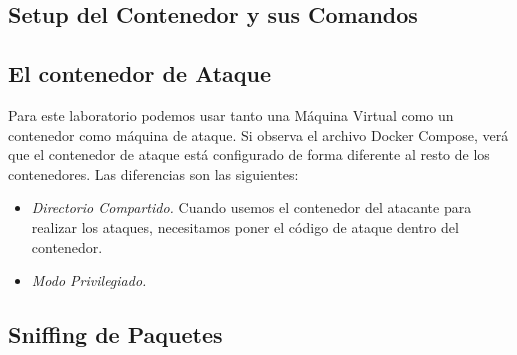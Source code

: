 \subsection{Setup del Contenedor y sus Comandos}




\subsection{El contenedor de Ataque}

Para este laboratorio podemos usar tanto una Máquina Virtual como un contenedor como máquina de ataque. Si observa el archivo Docker Compose, verá que el contenedor de ataque está configurado de forma diferente al resto de los contenedores. Las diferencias son las siguientes:

\begin{itemize}
\item \textit{Directorio Compartido.} Cuando usemos el contenedor del atacante para realizar los ataques, necesitamos poner el código de ataque dentro del contenedor.



\item \textit{Modo Privilegiado.}


\end{itemize}


\subsection{Sniffing de Paquetes} 





